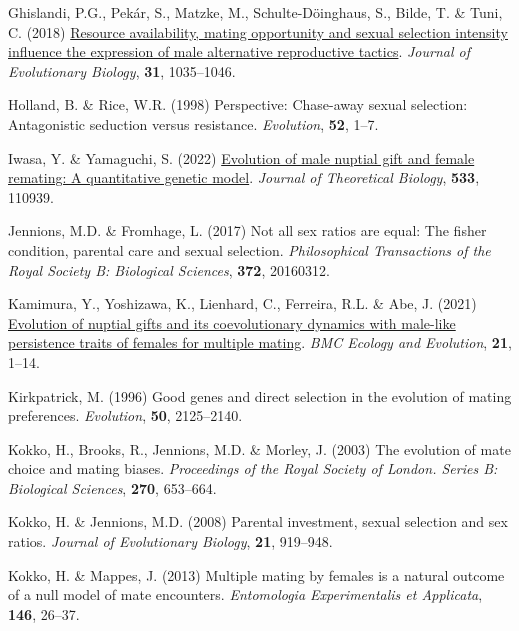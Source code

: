 \documentclass[
]{article}
\newlength{\cslhangindent}
\newlength{\cslentryspacingunit} %
\newenvironment{CSLReferences}[2] %
 {%
  \setlength{\parindent}{0pt}
  \ifodd #1
  \let\oldpar\par
  \def\par{\hangindent=\cslhangindent\oldpar}
  \fi
  \setlength{\parskip}{#2\cslentryspacingunit}
 }%
 {}
\begin{document}
\begin{CSLReferences}{0}{0}
\leavevmode{}%
Ghislandi, P.G., Pekár, S., Matzke, M., Schulte-Döinghaus, S., Bilde, T.
\& Tuni, C. (2018) \href{https://doi.org/10.1111/jeb.13284}{{Resource
availability, mating opportunity and sexual selection intensity
influence the expression of male alternative reproductive tactics}}.
\emph{Journal of Evolutionary Biology}, \textbf{31}, 1035--1046.

\leavevmode{}%
Holland, B. \& Rice, W.R. (1998) Perspective: Chase-away sexual
selection: Antagonistic seduction versus resistance. \emph{Evolution},
\textbf{52}, 1--7.

\leavevmode{}%
Iwasa, Y. \& Yamaguchi, S. (2022)
\href{https://doi.org/10.1016/j.jtbi.2021.110939}{{Evolution of male
nuptial gift and female remating: A quantitative genetic model}}.
\emph{Journal of Theoretical Biology}, \textbf{533}, 110939.

\leavevmode{}%
Jennions, M.D. \& Fromhage, L. (2017) Not all sex ratios are equal: The
fisher condition, parental care and sexual selection.
\emph{Philosophical Transactions of the Royal Society B: Biological
Sciences}, \textbf{372}, 20160312.

\leavevmode{}%
Kamimura, Y., Yoshizawa, K., Lienhard, C., Ferreira, R.L. \& Abe, J.
(2021) \href{https://doi.org/10.1186/s12862-021-01901-x}{{Evolution of
nuptial gifts and its coevolutionary dynamics with male-like persistence
traits of females for multiple mating}}. \emph{BMC Ecology and
Evolution}, \textbf{21}, 1--14.

\leavevmode{}%
Kirkpatrick, M. (1996) Good genes and direct selection in the evolution
of mating preferences. \emph{Evolution}, \textbf{50}, 2125--2140.

\leavevmode{}%
Kokko, H., Brooks, R., Jennions, M.D. \& Morley, J. (2003) The evolution
of mate choice and mating biases. \emph{Proceedings of the Royal Society
of London. Series B: Biological Sciences}, \textbf{270}, 653--664.

\leavevmode{}%
Kokko, H. \& Jennions, M.D. (2008) Parental investment, sexual selection
and sex ratios. \emph{Journal of Evolutionary Biology}, \textbf{21},
919--948.

\leavevmode{}%
Kokko, H. \& Mappes, J. (2013) Multiple mating by females is a natural
outcome of a null model of mate encounters. \emph{Entomologia
Experimentalis et Applicata}, \textbf{146}, 26--37.


\end{CSLReferences}
\end{document}
